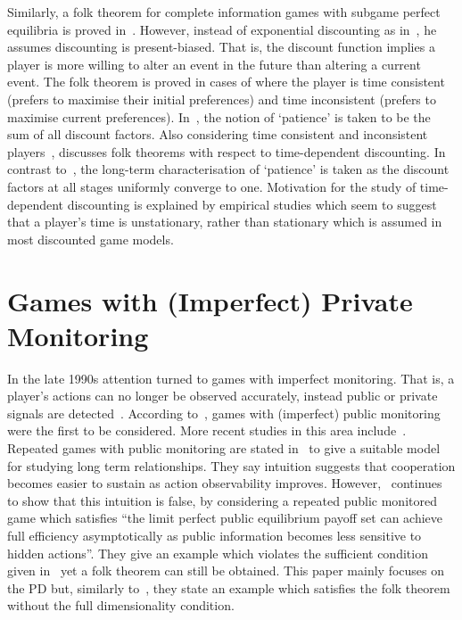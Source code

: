 Similarly, a folk theorem for complete information
games with subgame perfect equilibria is proved in~\cite{Bernergard2019}. However, instead of exponential
discounting as in~\cite{Abreu1994, Fudenberg1986}, he assumes discounting is
present-biased. That is, the discount function implies a player is more willing
to alter an event in the future than altering a current event. The folk theorem
is proved in cases of where the player is time consistent (prefers to maximise
their initial preferences) and time inconsistent (prefers to maximise current
preferences). In~\cite{Bernergard2019}, the notion of `patience' is taken to be the sum of all discount
factors. Also considering time consistent and inconsistent
players~\cite{Li2019}, discusses folk theorems with respect to time-dependent
discounting. In contrast
to~\cite{Bernergard2019}, the long-term characterisation of `patience' is taken
as the discount factors at all stages uniformly converge to one. Motivation for
the study of time-dependent discounting is explained by empirical studies which
seem to suggest that a player's time is unstationary, rather than stationary
which is assumed in most discounted game models.


\section{Games with (Imperfect) Private Monitoring}\label{sec:Games_with_(Imperfect)_Private_Monitoring}
In the late 1990s attention turned to games with imperfect monitoring. That is,
a player's actions can no longer be observed accurately, instead public or
private signals are detected~\cite{Durlauf2016}. According to~\cite{Matsushima2004}, games with (imperfect) public
monitoring were the first to be considered. More recent
studies in this area include~\cite{Chassang2011,Kandori2006}.
Repeated games with public monitoring are stated
in~\cite{Kandori2006} to give a
suitable model for studying long term relationships. They say intuition
suggests that cooperation becomes easier to sustain as action observability
improves. However,~\cite{Kandori2006} continues to show that this intuition is
false, by considering a repeated public monitored game which satisfies ``the
limit perfect public equilibrium payoff set can achieve full efficiency
asymptotically as public information becomes less sensitive to hidden actions''.
They give an example which violates the sufficient condition given
in~\cite{Maskin1994} yet a folk theorem can still be obtained. This paper mainly
focuses on
the PD but, similarly to~\cite{Abreu1994}, they state an example
which satisfies the folk theorem without the full dimensionality condition. 

